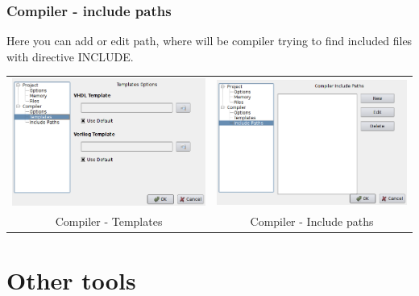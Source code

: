         \subsubsection{Compiler - include paths}
            Here you can add or edit path, where will be compiler trying to find included files with directive INCLUDE. 

        \begin{table}[h!]       
            \begin{tabular}{cc}
                \includegraphics[width=.5\textwidth]{img/NewImg/config5.png}
                    &
                \includegraphics[width=.5\textwidth]{img/NewImg/config6.png}
                    \\
                Compiler - Templates & Compiler - Include paths
            \end{tabular}
            \end{table}

\section{Other tools}

\clearpage

